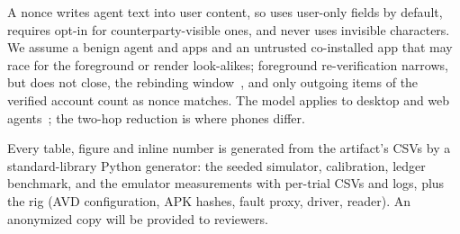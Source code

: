 A nonce writes agent text into user content, so \sys uses user-only fields by default, requires opt-in for counterparty-visible ones, and never uses invisible characters. We assume
a benign agent and apps and an untrusted co-installed app that may race for the foreground or render look-alikes; foreground re-verification narrows, but does not close, the
rebinding window~\cite{qian2026rebinding}, and only outgoing items of the verified account count as nonce matches. The model applies to desktop and web agents~\cite{xie2024osworld,zhou2024webarena}; the two-hop reduction is where phones differ.

Every table, figure and inline number is generated from the artifact's CSVs by a standard-library Python generator: the seeded simulator, calibration, ledger benchmark, and the
emulator measurements with per-trial CSVs and logs, plus the rig (AVD configuration, APK hashes, fault proxy, driver, reader). An anonymized copy will be provided to reviewers.
